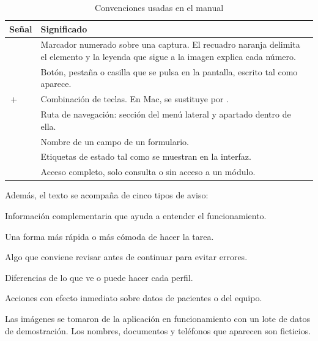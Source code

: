 \documentclass[11pt]{article}
\begin{document}
\begin{table}[H]
\centering\small
\caption{Convenciones usadas en el manual}\label{tab:convenciones}
\begin{tabularx}{\linewidth}{@{}P{4.4cm}L@{}}
\toprule
\textbf{Señal} & \textbf{Significado} \\
\midrule
{}\ \  & Marcador numerado sobre una captura. El recuadro naranja delimita el elemento y la leyenda que sigue a la imagen explica cada número. \\
 & Botón, pestaña o casilla que se pulsa en la pantalla, escrito tal como aparece. \\
\,+\, & Combinación de teclas. En Mac,  se sustituye por . \\
 & Ruta de navegación: sección del menú lateral y apartado dentro de ella. \\
 & Nombre de un campo de un formulario. \\
\  & Etiquetas de estado tal como se muestran en la interfaz. \\
\ \  & Acceso completo, solo consulta o sin acceso a un módulo. \\
\bottomrule
\end{tabularx}
\end{table}

Además, el texto se acompaña de cinco tipos de aviso:

\begin{sdnota}
Información complementaria que ayuda a entender el funcionamiento.
\end{sdnota}
\begin{sdconsejo}
Una forma más rápida o más cómoda de hacer la tarea.
\end{sdconsejo}
\begin{sdaviso}
Algo que conviene revisar antes de continuar para evitar errores.
\end{sdaviso}
\begin{sdpermiso}
Diferencias de lo que ve o puede hacer cada perfil.
\end{sdpermiso}
\begin{sdpeligro}
Acciones con efecto inmediato sobre datos de pacientes o del equipo.
\end{sdpeligro}

\begin{sdnota}
Las imágenes se tomaron de la aplicación en funcionamiento con un lote de datos de demostración. Los nombres, documentos y teléfonos que aparecen son ficticios.
\end{sdnota}
\end{document}
